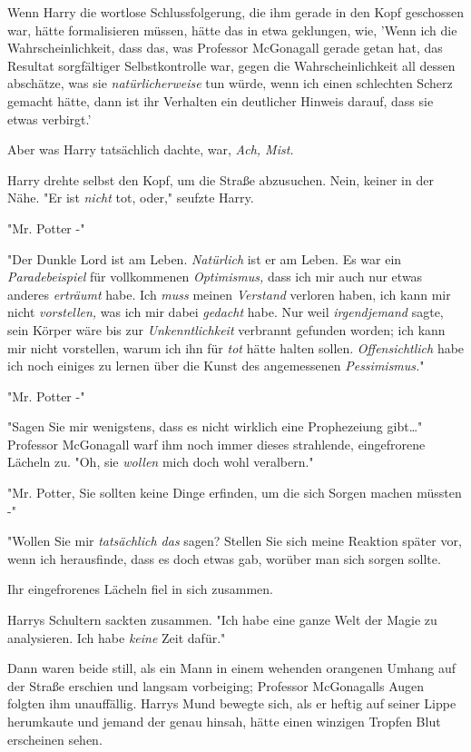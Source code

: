 {Wenn Harry die wortlose Schlussfolgerung, die ihm gerade in den Kopf geschossen war, hätte formalisieren müssen, hätte das in etwa geklungen, wie, 'Wenn ich die Wahrscheinlichkeit, dass das, was Professor McGonagall gerade getan hat, das Resultat sorgfältiger Selbstkontrolle war, gegen die Wahrscheinlichkeit all dessen abschätze, was sie \emph{natürlicherweise} tun würde, wenn ich einen schlechten Scherz gemacht hätte, dann ist ihr Verhalten ein deutlicher Hinweis darauf, dass sie etwas verbirgt.'

Aber was Harry tatsächlich dachte, war, \emph{Ach, Mist.}

Harry drehte selbst den Kopf, um die Straße abzusuchen. Nein, keiner in der Nähe. "Er ist \emph{nicht} tot, oder," seufzte Harry.

"Mr. Potter -"

"Der Dunkle Lord ist am Leben. \emph{Natürlich} ist er am Leben. Es war ein \emph{Paradebeispiel} für vollkommenen \emph{Optimismus,} dass ich mir auch nur etwas anderes \emph{erträumt} habe. Ich \emph{muss} meinen \emph{Verstand} verloren haben, ich kann mir nicht \emph{vorstellen,} was ich mir dabei \emph{gedacht} habe. Nur weil \emph{irgendjemand} sagte, sein Körper wäre bis zur \emph{Unkenntlichkeit} verbrannt gefunden worden; ich kann mir nicht vorstellen, warum ich ihn für \emph{tot} hätte halten sollen. \emph{Offensichtlich} habe ich noch einiges zu lernen über die Kunst des angemessenen \emph{Pessimismus.}"

"Mr. Potter -"

"Sagen Sie mir wenigstens, dass es nicht wirklich eine Prophezeiung gibt…" Professor McGonagall warf ihm noch immer dieses strahlende, eingefrorene Lächeln zu. "Oh, sie \emph{wollen} mich doch wohl veralbern."

"Mr. Potter, Sie sollten keine Dinge erfinden, um die sich Sorgen machen müssten -"

"Wollen Sie mir \emph{tatsächlich das} sagen? Stellen Sie sich meine Reaktion später vor, wenn ich herausfinde, dass es doch etwas gab, worüber man sich sorgen sollte.

Ihr eingefrorenes Lächeln fiel in sich zusammen.

Harrys Schultern sackten zusammen. "Ich habe eine ganze Welt der Magie zu analysieren. Ich habe \emph{keine} Zeit dafür."

Dann waren beide still, als ein Mann in einem wehenden orangenen Umhang auf der Straße erschien und langsam vorbeiging; Professor McGonagalls Augen folgten ihm unauffällig. Harrys Mund bewegte sich, als er heftig auf seiner Lippe herumkaute und jemand der genau hinsah, hätte einen winzigen Tropfen Blut erscheinen sehen.

}
